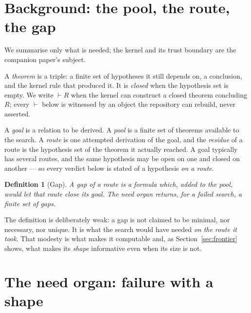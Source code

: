 \documentclass[11pt]{article}
\newtheorem{definition}{Definition}
\theoremstyle{remark}\newtheorem{remark}{Remark}
\begin{document}
\section{Background: the pool, the route, the gap}
\label{sec:background}

We summarise only what is needed; the kernel and its trust boundary are the companion
paper's subject.

A \emph{theorem} is a triple: a finite set of hypotheses it still depends on, a
conclusion, and the kernel rule that produced it. It is \emph{closed} when the hypothesis
set is empty. We write $\vdash R$ when the kernel can construct a closed theorem
concluding $R$; every $\vdash$ below is witnessed by an object the repository can rebuild,
never asserted.

A \emph{goal} is a relation to be derived. A \emph{pool} is a finite set of theorems
available to the search. A \emph{route} is one attempted derivation of the goal, and the
\emph{residue} of a route is the hypothesis set of the theorem it actually reached. A
goal typically has several routes, and the same hypothesis may be open on one and closed
on another --- so every verdict below is stated of a hypothesis \emph{on a route}.

\begin{definition}[Gap]\label{def:gap}
A \emph{gap} of a route is a formula which, added to the pool, would let that route close
its goal. The need organ returns, for a failed search, a finite set of gaps.
\end{definition}

The definition is deliberately weak: a gap is not claimed to be minimal, nor necessary,
nor unique. It is what the search would have needed \emph{on the route it took}. That
modesty is what makes it computable and, as Section~\ref{sec:frontier} shows, what makes
its \emph{shape} informative even when its size is not.

\section{The need organ: failure with a shape}
\label{sec:organ}
\end{document}
